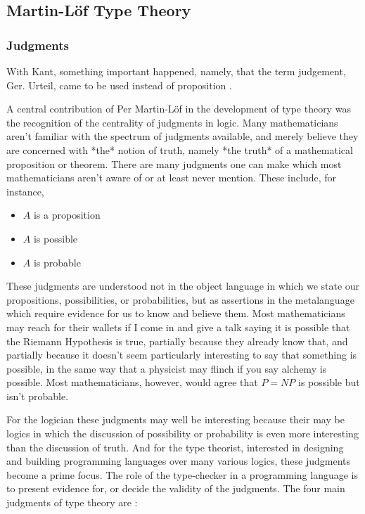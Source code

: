 \subsection{Martin-Löf Type Theory}
\subsubsection{Judgments}

\begin{displayquote}

With Kant, something important happened, namely, that the term judgement, Ger.
Urteil, came to be used instead of proposition \cite{mlMeanings}.

\end{displayquote}

A central contribution of Per Martin-Löf in the development of type theory was
the recognition of the centrality of judgments in logic. Many mathematicians
aren't familiar with the spectrum of judgments available, and merely believe
they are concerned with *the* notion of truth, namely *the truth* of a
mathematical proposition or theorem. There are many judgments one can make which
most mathematicians aren't aware of or at least never mention. These include,
for instance,

\begin{itemize}[noitemsep]

\item $A$ is a proposition
\item $A$ is possible
\item $A$ is probable

\end{itemize}

These judgments are understood not in the object language in which we state our
propositions, possibilities, or probabilities, but as assertions in the
metalanguage which require evidence for us to know and believe them. Most
mathematicians may reach for their wallets if I come in and give a talk saying
it is possible that the Riemann Hypothesis is true, partially because they
already know that, and partially because it doesn't seem particularly
interesting to say that something is possible, in the same way that a physicist
may flinch if you say alchemy is possible. Most mathematicians, however, would
agree that $P = NP$ is possible but isn't probable.

For the logician these judgments may well be interesting because their may be
logics in which the discussion of possibility or probability is even more
interesting than the discussion of truth. And for the type theorist, interested
in designing and building programming languages over many various logics, these
judgments become a prime focus. The role of the type-checker in a programming
language is to present evidence for, or decide the validity of the judgments.
The four main judgments of type theory are :

